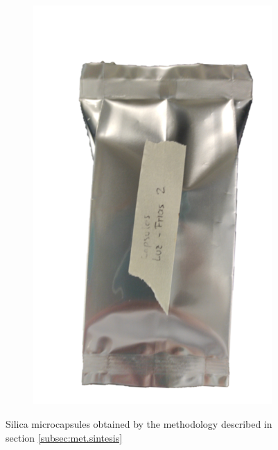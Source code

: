 \begin{refsection}
\begin{figure}[h]
\begin{subfigure}[b]{0.3\linewidth}
        \includegraphics[width=0.8\linewidth]{Documento_Latex/Tesis 2/Imagenes/Sealed_Bag.png}
        \label{fig:sealed_bag}
    \end{subfigure}
    \caption{Silica microcapsules obtained by the methodology described in section \ref{subsec:met.sintesis}}
    \label{fig:bags}
\end{figure}
 




\end{refsection}